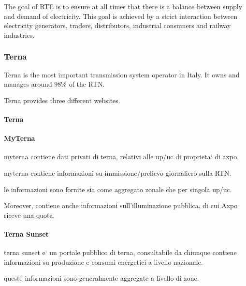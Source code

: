    The goal of RTE is to ensure at all times that there is a balance between supply and demand of electricity.
    This goal is achieved by a strict interaction between electricity generators, traders, distributors, industrial consumers and railway industries.\cite{bib:rte:desc}
    
\subsubsection{Terna} \label{section:providers:terna}
    Terna is the most important transmission system operator in Italy.
    It owns and manages around 98\% of the RTN.
    
    Terna provides three different websites.
    \paragraph{Terna}
    \paragraph{MyTerna}
        myterna contiene dati privati di terna, relativi alle up/uc di proprieta` di axpo.
        
        myterna contiene informazioni su immissione/prelievo giornaliero sulla RTN.
        
        le informazioni sono fornite sia come aggregato zonale che per singola up/uc.
        
        Moreover, contiene anche informazioni sull'illuminazione pubblica, di cui Axpo riceve una quota.
    \paragraph{Terna Sunset}
        terna sunset e` un portale pubblico di terna, consultabile da chiunque
        contiene informazioni su produzione e consumi energetici a livello nazionale.
        
        queste informazioni sono generalmente aggregate a livello di zone.